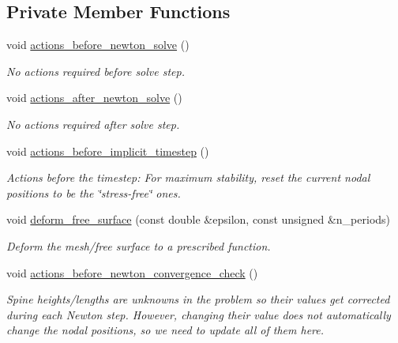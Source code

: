 \subsection*{Private Member Functions}
\begin{DoxyCompactItemize}
\item 
void \hyperlink{classInterfaceProblem_ade63c8a74f666edf530460b989968b4f}{actions\+\_\+before\+\_\+newton\+\_\+solve} ()
\begin{DoxyCompactList}\small\item\em No actions required before solve step. \end{DoxyCompactList}\item 
void \hyperlink{classInterfaceProblem_aedc2e58b3d2f5f8c898a21ba2d245cee}{actions\+\_\+after\+\_\+newton\+\_\+solve} ()
\begin{DoxyCompactList}\small\item\em No actions required after solve step. \end{DoxyCompactList}\item 
void \hyperlink{classInterfaceProblem_ae3ec75fcc8ccca97207dc7eca23b1cce}{actions\+\_\+before\+\_\+implicit\+\_\+timestep} ()
\begin{DoxyCompactList}\small\item\em Actions before the timestep\+: For maximum stability, reset the current nodal positions to be the \char`\"{}stress-\/free\char`\"{} ones. \end{DoxyCompactList}\item 
void \hyperlink{classInterfaceProblem_a2319232b08d9df1ab473f6cbd40939d5}{deform\+\_\+free\+\_\+surface} (const double \&epsilon, const unsigned \&n\+\_\+periods)
\begin{DoxyCompactList}\small\item\em Deform the mesh/free surface to a prescribed function. \end{DoxyCompactList}\item 
void \hyperlink{classInterfaceProblem_ab4193771472aefce4cd67261491cc344}{actions\+\_\+before\+\_\+newton\+\_\+convergence\+\_\+check} ()
\begin{DoxyCompactList}\small\item\em Spine heights/lengths are unknowns in the problem so their values get corrected during each Newton step. However, changing their value does not automatically change the nodal positions, so we need to update all of them here. \end{DoxyCompactList}\item 

\end{DoxyCompactItemize}
